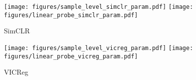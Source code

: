 \begin{figure*}[h]
     \begin{subfigure}[b]{0.49\textwidth}
         \centering
         \texttt{[image: figures/sample\_level\_simclr\_param.pdf]}
         \texttt{[image: figures/linear\_probe\_simclr\_param.pdf]}
         \caption{SimCLR}
         \label{fig:simclr temperature}
     \end{subfigure}
     \hfill
     \begin{subfigure}[b]{0.49\textwidth}
         \centering
         \texttt{[image: figures/sample\_level\_vicreg\_param.pdf]}
         \texttt{[image: figures/linear\_probe\_vicreg\_param.pdf]}
         \caption{VICReg}
         \label{fig:vicreg temperature}
     \end{subfigure}
\caption[Effect of SSL hyperparameter on \dejavu memorization.]{
Effect of SSL hyperparameter on \dejavu memorization. The left plot of Figures \ref{fig:simclr temperature} and \ref{fig:vicreg temperature} show the size of the memorized set as a function of the temperature parameter for SimCLR and invariance parameter for VICReg, respectively. \Dejavu memorization is the highest within a narrow band of hyperparameters, and one can mitigate against \dejavu memorization by selecting hyperparameters outside of this band. Doing so has negligible effect on the quality of SSL embeddings as indicated by the linear probe accuracy on ImageNet validation set.
 }
\label{fig:sweep params}
\end{figure*}